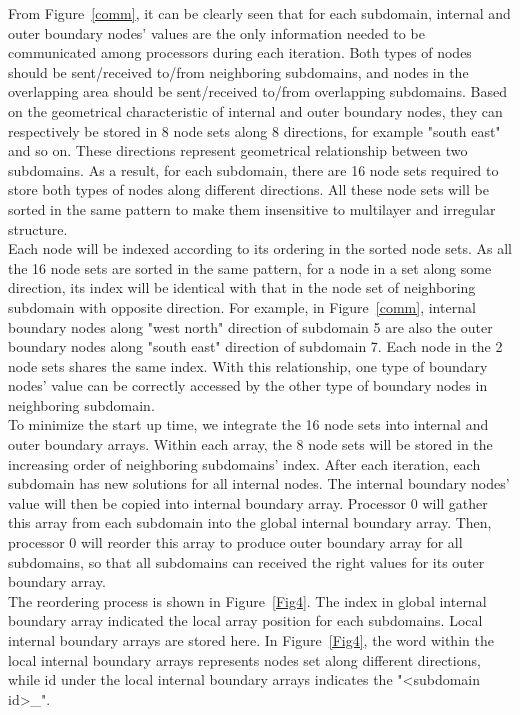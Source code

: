 \documentclass{sig-alternate}
\begin{document}
	From Figure~\ref{comm}, it can be clearly seen that for each subdomain, internal and outer boundary nodes' values 
	are the only information needed to be communicated among processors during each iteration. Both types of nodes should be 
	sent/received to/from neighboring subdomains, and nodes in the overlapping area should be sent/received to/from  
	overlapping subdomains. Based on the geometrical characteristic of internal and outer boundary nodes, they can respectively 
	be stored in 8 node sets along 8 directions, for example "south east" and so on. These directions represent geometrical 
	relationship between two subdomains. As a result, for each subdomain, there are 16 node sets required to store both types of 
	nodes along different directions. All these node sets will be sorted in the same pattern to make them insensitive to 
	multilayer and irregular structure.\\ 

	Each node will be
	indexed according to its ordering in the sorted node sets. As all the 16 node sets are sorted in the same pattern, for a node in
	a set along some direction, its index will be identical with that in the node set of neighboring subdomain with opposite
	direction. For example, in Figure~\ref{comm}, internal boundary nodes along "west north" 
	direction of subdomain 5 are also the outer boundary nodes along "south east" direction of subdomain 7. Each node in the 
	2 node sets shares the same index. With this relationship, one type of boundary nodes' value can be 
	correctly accessed by the other type of boundary nodes in neighboring subdomain.\\

	To minimize the start up time, we integrate the 16 node sets into internal and outer boundary arrays. 
	Within each array, the 8 node sets will be stored in the increasing order of neighboring subdomains' index. 
	After each iteration, each subdomain has new solutions for all internal nodes. The internal 
	boundary nodes' value will then be copied into internal boundary array. Processor 0 will gather this array from each subdomain
	into the global internal boundary array. Then, processor 0 will reorder this array to produce outer boundary array 
	for all subdomains, so that all subdomains can received the right values for its outer boundary array.\\ 

	The reordering process is shown in Figure~\ref{Fig4}. The index in global internal boundary array indicated the local array 
	position for each subdomains. Local internal boundary arrays are stored here. In Figure~\ref{Fig4}, the word within the local
	internal boundary arrays represents nodes set along different directions, while id under the local
	internal boundary arrays indicates the "<subdomain id>\_<local array id>".\\	
\end{document}
